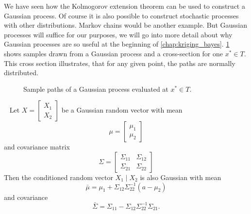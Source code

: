 We have seen how the Kolmogorov extension theorem can be used to construct a Gaussian process.
Of course it is also possible to construct stochastic processes with other distributions.
Markov chains would be another example. 
But Gaussian processes will suffice for our purposes, we will go into more detail about why Gaussian processes are so useful at the beginning of \cref{chap:kriging_bayes}. 
\cref{fig:gaussian_process_evaluated} shows samples drawn from a Gaussian process and a cross-section for one $x^{*} \in T$. 
This cross section illustrates, that for any given point, the paths are normally distributed.
\begin{figure}
    \centering
    
    \caption{Sample paths of a Gaussian process evaluated at \( x^{*} \in T \).}
    \label{fig:gaussian_process_evaluated}
\end{figure}



\begin{lemma}~\label{lem:conditioned_gaussian_random_vector}
    Let \( X = \begin{bmatrix}
    X_{1} \\
    X_{2}
    \end{bmatrix} \) be a Gaussian random vector with mean
    \[
        \mu = 
        \begin{bmatrix}
        \mu_{1}\\
        \mu_{2}
        \end{bmatrix}
    \]
    and covariance matrix
    \[
        \Sigma= 
        \begin{bmatrix}
        \Sigma_{11} & \Sigma_{12}\\
        \Sigma_{21} & \Sigma_{22}
        \end{bmatrix}
    \]
    Then the conditioned random vector \( X_{1} \mid X_{2} \) is also Gaussian with mean
    \[
        \bar{\mu} = \mu_{1} + \Sigma_{12} \Sigma_{22}^{-1}(a-\mu_{2})
    \]
    and covariance
    \[
        \bar{\Sigma} =  \Sigma_{11} - \Sigma_{12} \Sigma_{22}^{-1} \Sigma_{21}.
    \]
\end{lemma}


